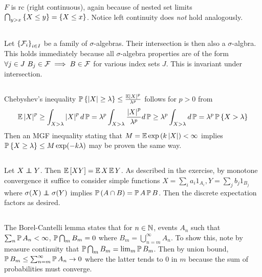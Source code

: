 \documentclass{article}
\begin{document}
     \subsubsection{}
     \(F\) is rc (right continuous), again because of nested set limits \(\bigcap_{y>x}\ca{X\le y}=\ca{X\le x}\). Notice left continuity does {\em not} hold analogously.

     \subsection{}
     Let \(\ca{\mcF_i}_{i\in I}\) be a family of \(\sigma\)-algebras. Their intersection is then also a \(\sigma\)-algbra. This holds immediately because all \(\sigma\)-algebra properties are of the form \(\forall j\in J\,\,B_j\in \mcF\implies B\in \mcF\) for various index sets \(J\). This is invariant under intersection.
     

     \subsection{}
     Chebyshev's inequality \(\P\ca{|X|\ge\lambda}\le \frac{\E\abs{X}^p}{\lambda^p}\) follows for \(p>0\) from
     \[
       \E\abs{X}^p\ge\int_{X>\lambda}\abs{X}^pd\P=\lambda^p \int_{X>\lambda}\frac{\abs{X}^p}{\lambda^p}d\P\ge \lambda^p \int_{X>\lambda}d\P=\lambda^p\P\ca{X>\lambda}
     \]
     Then an MGF inequality stating that \(M=\E\exp\pa{k\abs{X}}<\infty\) implies \(\P\ca{X\ge\lambda}\le M\exp(-k\lambda)\) may be proven the same way.

     \subsection{}
     Let \(X\independent Y\). Then \(\E\ha{XY}=\E X\E Y\). As described in the exercise, by monotone convergence it suffice to consider simple functions \(X=\sum_ia_i1_{A_i},Y=\sum_jb_j1_{B_j}\) where \(\sigma(X)\independent\sigma(Y)\) implies \(\P\pa{A\cap B}=\P A\P B\). Then the discrete expectation factors as desired.

     \subsection{}
     The Borel-Cantelli lemma states that for \(n\in\N\), events \(A_n\) such that \(\sum_n \P A_n<\infty\), \(\P\bigcap_m B_m=0\) where \(B_m=\bigcup_{n=m}^\infty A_n\). To show this, note by measure continuity that \(\P\bigcap_m B_m=\lim_m\P B_m\). Then by union bound, \(\P B_m\le \sum_{n=m}^\infty \P A_n\rightarrow 0\) where the latter tends to \(0\) in \(m\) because the sum of probabilities must converge.
\end{document}
